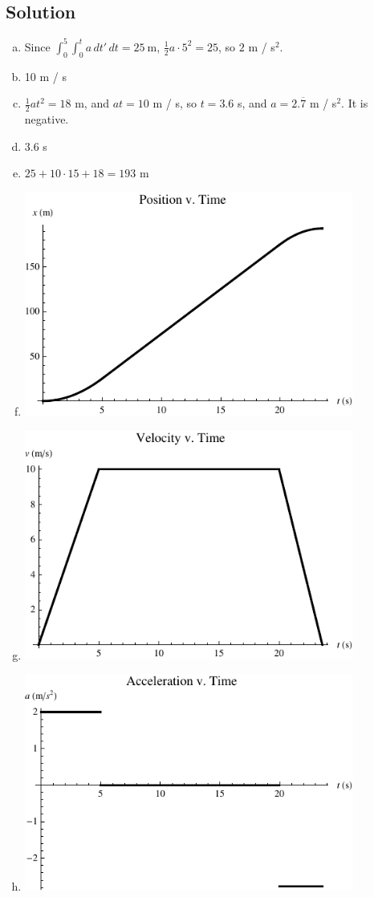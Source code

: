\documentclass[solutions]{esg8012pset}
\begin{document}
\subsection{Solution}
  \begin{enumerate}[a)]
    \item Since $\displaystyle \int_{0}^{5}\int_{0}^{t} a \,d{t'}\,d{t} = 25\ \text{m}$, $\frac{1}{2}a \cdot 5^2 = 25$, so $2$ m / s$^2$.
    \item 10 m / s
    \item $\frac{1}{2}at^2 = 18$ m, and $at = 10$ m / s, so $t = 3.6$ s, and $a = 2.\overline{7}$ m / s$^2$.  It is negative.
    \item 3.6 s
    \item $25 + 10 \cdot 15 + 18 = 193$ m
    \item \includegraphics[width=0.85\textwidth]{ps01_Plot_1}
    \item \includegraphics[width=0.85\textwidth]{ps01_Plot_2}
    \item \includegraphics[width=0.85\textwidth]{ps01_Plot_3}
  \end{enumerate}
\end{document}
